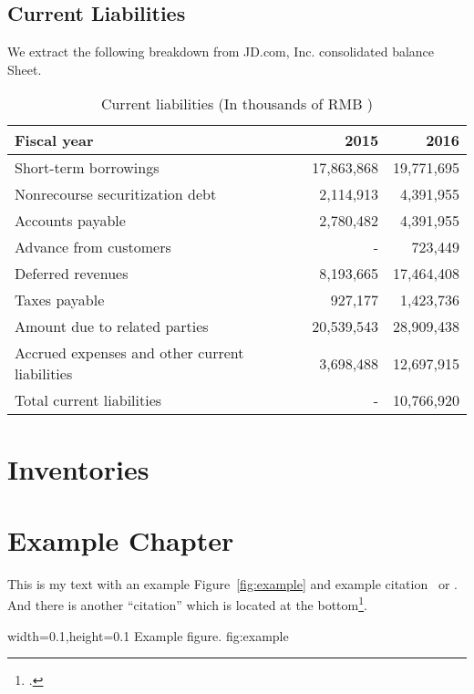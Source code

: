 \section{Current Liabilities}

We extract the following breakdown from JD.com, Inc. consolidated balance Sheet.\\
 
\begin{table}[H]	
	\begin{center}
		\begin{tabular}{lrr}
			\toprule
			\textbf{Fiscal year}&\textbf{2015}&\textbf{2016}\\
			\midrule
			Short-term borrowings&17,863,868&19,771,695\\
			Nonrecourse securitization debt&2,114,913&4,391,955\\
			Accounts payable&2,780,482&4,391,955\\
			Advance from customers&-&723,449\\
			Deferred revenues&8,193,665&17,464,408\\
			Taxes payable&927,177&1,423,736\\
			Amount due to related parties&20,539,543&28,909,438\\
			Accrued expenses and other current liabilities&3,698,488&12,697,915\\
			Total current liabilities&-&10,766,920\\
			\bottomrule
		\end{tabular}
	\end{center}
	\caption{Current liabilities (In thousands of RMB \textyen)}\label{table:1}
\end{table}

	

\chapter{Inventories}

\chapter{Example Chapter}

This is my text with an example Figure~\ref{fig:example} and example
citation~\cite{StrunkWhite} or \textcite{Bringhurst1993}. And there is another
\enquote{citation} which is located at the bottom\footcite{tagstore}.

  {width=0.1\textwidth,height=0.1\textheight}%
  {Example figure.}%
  {}%
  {fig:example}%

